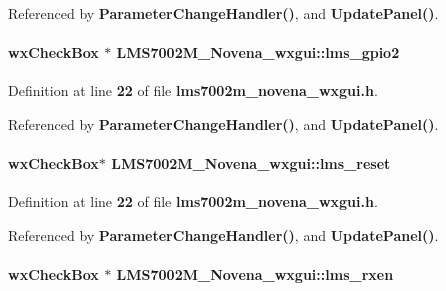 Referenced by {\bf Parameter\+Change\+Handler()}, and {\bf Update\+Panel()}.

\paragraph[{lms\+\_\+gpio2}]{\setlength{\rightskip}{0pt plus 5cm}wx\+Check\+Box $\ast$ L\+M\+S7002\+M\+\_\+\+Novena\+\_\+wxgui\+::lms\+\_\+gpio2}\label{classLMS7002M__Novena__wxgui_a20dabf563a81e9e1f48253bd11dd623e}


Definition at line {\bf 22} of file {\bf lms7002m\+\_\+novena\+\_\+wxgui.\+h}.



Referenced by {\bf Parameter\+Change\+Handler()}, and {\bf Update\+Panel()}.

\paragraph[{lms\+\_\+reset}]{\setlength{\rightskip}{0pt plus 5cm}wx\+Check\+Box$\ast$ L\+M\+S7002\+M\+\_\+\+Novena\+\_\+wxgui\+::lms\+\_\+reset}\label{classLMS7002M__Novena__wxgui_a6f86f70607f9affc47dae0c9631077ab}


Definition at line {\bf 22} of file {\bf lms7002m\+\_\+novena\+\_\+wxgui.\+h}.



Referenced by {\bf Parameter\+Change\+Handler()}, and {\bf Update\+Panel()}.

\paragraph[{lms\+\_\+rxen}]{\setlength{\rightskip}{0pt plus 5cm}wx\+Check\+Box $\ast$ L\+M\+S7002\+M\+\_\+\+Novena\+\_\+wxgui\+::lms\+\_\+rxen}\label{classLMS7002M__Novena__wxgui_a50c73727ea2dce146aaf5a0d48859d6b}


